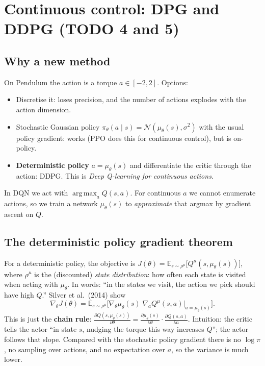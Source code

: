 \documentclass[11pt,a4paper]{article}
\DeclareMathOperator{\argmax}{arg\,max}
\newcommand{\E}{\mathbb{E}}
\newcommand{\pit}{\pi_\theta}
\newcommand{\gradt}{\nabla_\theta}
\begin{document}
\section{Continuous control: DPG and DDPG (TODO 4 and 5)}\label{sec:ddpg}

\subsection{Why a new method}
On Pendulum the action is a torque $a\in[-2,2]$. Options:
\begin{itemize}[nosep]
  \item Discretise it: loses precision, and the number of actions explodes with the action dimension.
  \item Stochastic Gaussian policy $\pit(a\mid s)=\mathcal N(\mu_\theta(s),\sigma^2)$ with the usual policy gradient: works (PPO does this for continuous control), but is on-policy.
  \item \textbf{Deterministic policy} $a=\mu_\theta(s)$ and differentiate the critic through the action: DDPG. This is \emph{Deep Q-learning for continuous actions}.
\end{itemize}
In DQN we act with $\argmax_a Q(s,a)$. For continuous $a$ we cannot enumerate actions, so we train a network $\mu_\theta(s)$ to \emph{approximate} that argmax by gradient ascent on $Q$.

\subsection{The deterministic policy gradient theorem}
For a deterministic policy, the objective is $J(\theta)=\E_{s\sim\rho^\mu}\big[Q^\mu(s,\mu_\theta(s))\big]$, where $\rho^\mu$ is the (discounted) \emph{state distribution}: how often each state is visited when acting with $\mu_\theta$. In words: \enquote{in the states we visit, the action we pick should have high $Q$.} Silver et al.\ (2014) show
\begin{equation}
  \gradt J(\theta) = \E_{s\sim\rho^\mu}\Big[\gradt\mu_\theta(s)\;\nabla_a Q^\mu(s,a)\big|_{a=\mu_\theta(s)}\Big].
  \label{eq:dpg}
\end{equation}
This is just the \textbf{chain rule}: $\frac{\partial Q(s,\mu_\theta(s))}{\partial\theta} = \frac{\partial\mu_\theta(s)}{\partial\theta}\cdot\frac{\partial Q(s,a)}{\partial a}$.
Intuition: the critic tells the actor \enquote{in state $s$, nudging the torque this way increases $Q$}; the actor follows that slope.
Compared with the stochastic policy gradient there is no $\log\pi$, no sampling over actions, and no expectation over $a$, so the variance is much lower.
\end{document}
